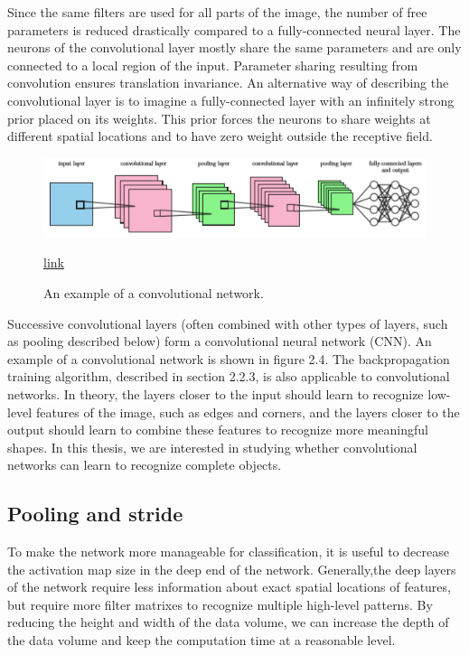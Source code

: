 Since the same filters are used for all parts of the image, the number of free parameters is reduced drastically compared to a fully-connected neural layer. The neurons of the convolutional layer mostly share the same parameters and are only connected to a local region of the input. Parameter sharing resulting from convolution ensures translation invariance. An alternative way of describing the convolutional layer is to imagine a fully-connected layer with an infinitely strong prior placed on its weights. This prior forces the neurons to share weights at different spatial locations and to have zero weight outside the receptive field.

\begin{figure}
	\centering
	\includegraphics[width=0.7\linewidth]{img4}
	\caption{ An example of a convolutional network.} \href{https://www.semanticscholar.org/paper/Object-detection-from-images-using-convolutional-Stenroos/a6ee78ea9c68d99d6545227fed925a721337bb16/figure/3}{link}
	\label{fig:img4}
\end{figure}

Successive convolutional layers (often combined with other types of layers, such as pooling described below) form a convolutional neural network (CNN). An example of a convolutional network is shown in figure 2.4. The backpropagation training algorithm, described in section 2.2.3, is also applicable to convolutional networks. In theory, the layers closer to the input should learn to recognize low-level features of the image, such as edges and corners, and the layers closer to the output should learn to combine these features to recognize more meaningful shapes. In this thesis, we are interested in studying whether convolutional networks can learn to recognize complete objects.


\subsection{ Pooling and stride}
To make the network more manageable for classification, it is useful to decrease the activation map size in the deep end of the network. Generally,the deep layers of the network require less information about exact spatial locations of features, but require more filter matrixes to recognize multiple high-level patterns. By reducing the height and width of the data volume, we can increase the depth of the data volume and keep the computation time at a reasonable level. 

